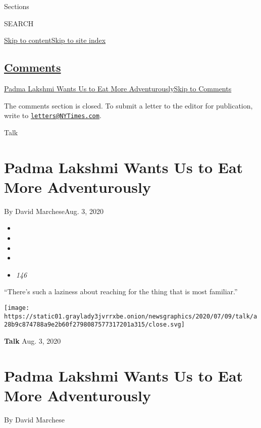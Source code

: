 Sections

SEARCH

\protect\hyperlink{site-content}{Skip to
content}\protect\hyperlink{site-index}{Skip to site index}

\hypertarget{comments}{%
\subsection{\texorpdfstring{\protect\hyperlink{commentsContainer}{Comments}}{Comments}}\label{comments}}

\href{}{Padma Lakshmi Wants Us to Eat More Adventurously}\href{}{Skip to
Comments}

The comments section is closed. To submit a letter to the editor for
publication, write to
\href{mailto:letters@NYTimes.com}{\nolinkurl{letters@NYTimes.com}}.

Talk

\hypertarget{padma-lakshmi-wants-us-to-eat-more-adventurously}{%
\section{Padma Lakshmi Wants Us to Eat More
Adventurously}\label{padma-lakshmi-wants-us-to-eat-more-adventurously}}

By David MarcheseAug. 3, 2020

\begin{itemize}
\item
\item
\item
\item
\item
  \emph{146}
\end{itemize}

``There's such a laziness about reaching for the thing that is most
familiar.''

\texttt{[image: https://static01.graylady3jvrrxbe.onion/newsgraphics/2020/07/09/talk/a28b9c874788a9e2b60f2798087577317201a315/close.svg]}

\textbf{Talk} Aug. 3, 2020

\hypertarget{padma-lakshmi-wants-us-to-eat-more-adventurously-1}{%
\section{Padma Lakshmi Wants Us to Eat More
Adventurously}\label{padma-lakshmi-wants-us-to-eat-more-adventurously-1}}

By David Marchese

